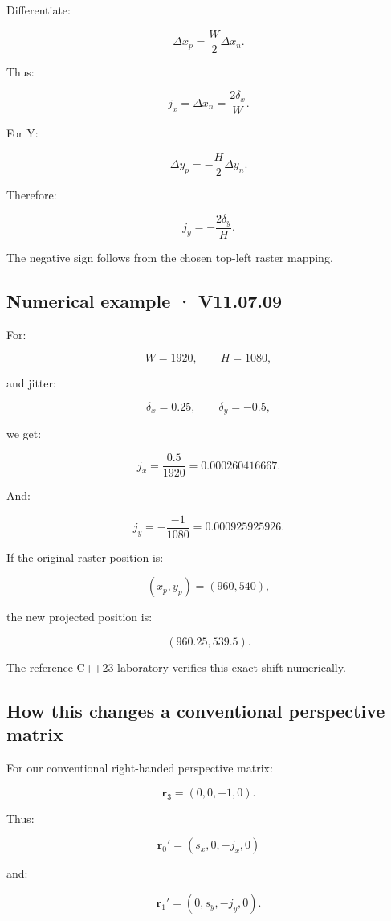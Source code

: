 Differentiate:

\[
 \Delta x_p=\frac W2\Delta x_n.
\]

Thus:

\[
 \boxed{ j_x=\Delta x_n=\frac{2\delta_x}{W} }.
\]

For Y:

\[
 \Delta y_p=-\frac H2\Delta y_n.
\]

Therefore:

\[
 \boxed{ j_y=-\frac{2\delta_y}{H} }.
\]

The negative sign follows from the chosen top-left raster mapping.

\subsection{Numerical example · V11.07.09}\label{02-foundations-ii-ch036-numerical-example-v11.07.09}

For:

\[
 W=1920,\qquad H=1080,
\]

and jitter:

\[
 \delta_x=0.25,\qquad\delta_y=-0.5,
\]

we get:

\[
 j_x=\frac{0.5}{1920} =\boxed{0.000260416667}.
\]

And:

\[
 j_y=-\frac{-1}{1080} =\boxed{0.000925925926}.
\]

If the original raster position is:

\[
 (x_p,y_p)=(960,540),
\]

the new projected position is:

\[
 \boxed{(960.25,539.5)}.
\]

The reference C++23 laboratory verifies this exact shift numerically.

\subsection{How this changes a conventional perspective matrix}\label{02-foundations-ii-ch036-how-this-changes-a-conventional-perspective-matrix}

For our conventional right-handed perspective matrix:

\[
 \mathbf r_3=(0,0,-1,0).
\]

Thus:

\[
 \mathbf r_0'= (s_x,0,-j_x,0)
\]

and:

\[
 \mathbf r_1'= (0,s_y,-j_y,0).
\]

